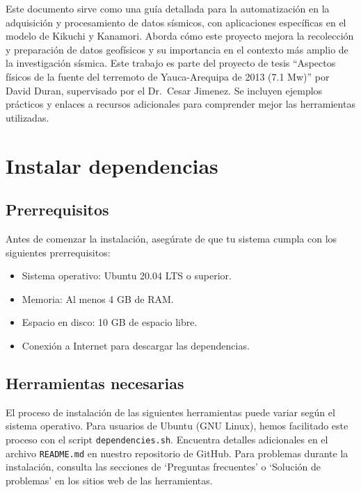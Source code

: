 \documentclass[a4paper,11pt]{refart}
\begin{document}
Este documento sirve como una guía detallada para la automatización en la adquisición y procesamiento de datos sísmicos, con aplicaciones específicas en el modelo de Kikuchi y Kanamori.
Aborda cómo este proyecto mejora la recolección y preparación de datos geofísicos y su importancia en el contexto más amplio de la investigación sísmica. 
Este trabajo es parte del proyecto de tesis ``Aspectos físicos de la fuente del terremoto de Yauca-Arequipa de 2013 (7.1 Mw)'' por David Duran, supervisado por el Dr.\ Cesar Jimenez.
Se incluyen ejemplos prácticos y enlaces a recursos adicionales para comprender mejor las herramientas utilizadas.

\section{Instalar dependencias}

\subsection{Prerrequisitos}

Antes de comenzar la instalación, asegúrate de que tu sistema cumpla con los siguientes prerrequisitos:

\begin{itemize}
  \item Sistema operativo: Ubuntu 20.04 LTS o superior.
  \item Memoria: Al menos 4 GB de RAM.\@
  \item Espacio en disco: 10 GB de espacio libre.
  \item Conexión a Internet para descargar las dependencias.
\end{itemize}

\subsection{Herramientas necesarias}

\begin{leftbar}
  El proceso de instalación de las siguientes herramientas puede variar según el sistema operativo. Para usuarios de Ubuntu (GNU Linux), hemos facilitado este proceso con el script \texttt{dependencies.sh}. Encuentra detalles adicionales en el archivo \texttt{README.md} en nuestro repositorio de GitHub. Para problemas durante la instalación, consulta las secciones de `Preguntas frecuentes' o `Solución de problemas' en los sitios web de las herramientas.
\end{leftbar}
\end{document}
